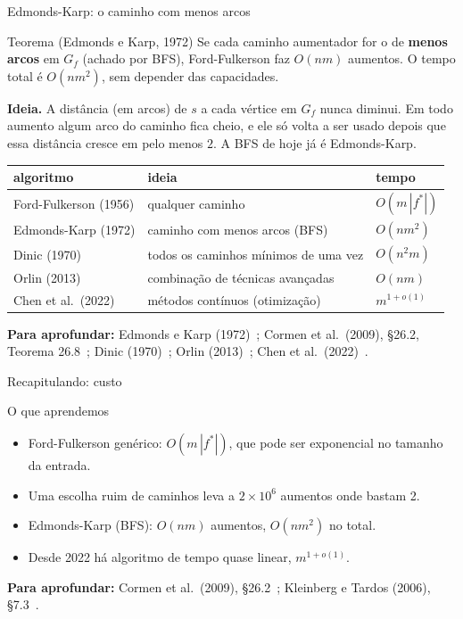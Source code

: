 \documentclass[aspectratio=169,xcolor=table]{beamer}
\newcommand{\fonte}[1]{%
  \vfill
  {\tiny\color{gray!55!black}\textbf{Para aprofundar:} #1\par}%
}
\begin{document}
\begin{frame}{Edmonds-Karp: o caminho com menos arcos}
  \begin{block}{Teorema (Edmonds e Karp, 1972)}
    \small
    Se cada caminho aumentador for o de \textbf{menos arcos} em $G_f$ (achado por BFS),
    Ford-Fulkerson faz $O(nm)$ aumentos. O tempo total é $O(nm^2)$, sem depender das
    capacidades.
  \end{block}
  \scriptsize
  \textbf{Ideia.} A distância (em arcos) de $s$ a cada vértice em $G_f$ nunca diminui. Em todo
  aumento algum arco do caminho fica cheio, e ele só volta a ser usado depois que essa distância
  cresce em pelo menos $2$. A BFS de hoje já é Edmonds-Karp.
  \smallskip

  \centering
  \begin{tabular}{lll}
    \toprule
    algoritmo & ideia & tempo \\
    \midrule
    Ford-Fulkerson (1956) & qualquer caminho & $O(m\,|f^*|)$ \\
    Edmonds-Karp (1972) & caminho com menos arcos (BFS) & $O(nm^2)$ \\
    Dinic (1970) & todos os caminhos mínimos de uma vez & $O(n^2 m)$ \\
    Orlin (2013) & combinação de técnicas avançadas & $O(nm)$ \\
    Chen et al.\ (2022) & métodos contínuos (otimização) & $m^{1+o(1)}$ \\
    \bottomrule
  \end{tabular}
  \fonte{Edmonds e Karp (1972)~\cite{edmonds1972theoretical}; Cormen et al.\ (2009), \S 26.2,
    Teorema 26.8~\cite{cormen2009introduction}; Dinic (1970)~\cite{dinic1970algorithm};
    Orlin (2013)~\cite{orlin2013max}; Chen et al.\ (2022)~\cite{chen2022maximum}.}
\end{frame}

\begin{frame}{Recapitulando: custo}
  \begin{block}{O que aprendemos}
    \begin{itemize}
      \item Ford-Fulkerson genérico: $O(m\,|f^*|)$, que pode ser exponencial no tamanho da
        entrada.
      \item Uma escolha ruim de caminhos leva a $2 \times 10^6$ aumentos onde bastam 2.
      \item Edmonds-Karp (BFS): $O(nm)$ aumentos, $O(nm^2)$ no total.
      \item Desde 2022 há algoritmo de tempo quase linear, $m^{1+o(1)}$.
    \end{itemize}
  \end{block}
  \fonte{Cormen et al.\ (2009), \S 26.2~\cite{cormen2009introduction};
    Kleinberg e Tardos (2006), \S 7.3~\cite{kleinberg2006algorithm}.}
\end{frame}
\end{document}
